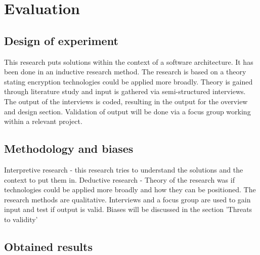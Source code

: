 \chapter{Evaluation}\label{s:evaluation}

\section{Design of experiment}
This research puts solutions within the context of a software architecture. It has been done in an inductive research method. The research is based on a theory stating encryption technologies
could be applied more broadly. Theory is gained through literature study and input is gathered via semi-structured interviews. The output of the interviews is coded, resulting in the output for the overview and design section. Validation of output will be done via a focus group working within a relevant project.

\section{Methodology and biases}
Interpretive research - this research tries to understand the solutions and the context to put them in. 
Deductive research - Theory of the research was if technologies could be applied more broadly and how they can be positioned.
The research methods are qualitative. Interviews and a focus group are used to gain input and test if output is valid. Biases will be discussed in the section 'Threats to validity'

\section{Obtained results}





